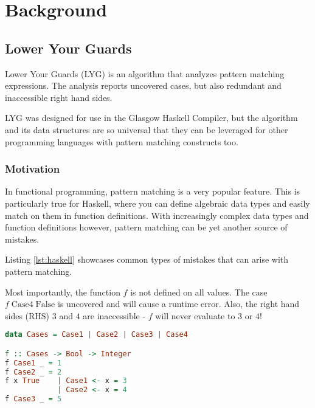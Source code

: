 \chapter{Background}\label{sec:background}

\section{Lower Your Guards}

Lower Your Guards (LYG) is an algorithm that analyzes pattern matching expressions.
The analysis reports uncovered cases, but also redundant and inaccessible right hand sides.

LYG was designed for use in the Glasgow Haskell Compiler,
but the algorithm and its data structures are so universal
that they can be leveraged for other programming languages with pattern matching constructs too.


\subsection{Motivation}

In functional programming, pattern matching is a very popular feature.
This is particularly true for Haskell, where you can define algebraic data types
and easily match on them in function definitions.
With increasingly complex data types and function definitions however,
pattern matching can be yet another source of mistakes.

Listing \ref{lst:haskell} showcases common types of mistakes that can arise with pattern matching.

Most importantly, the function $f$ is not defined on all values.
The case $f\;\mathrm{Case4}\;\mathrm{False}$ is uncovered and will cause a runtime error.
Also, the right hand sides (RHS) $3$ and $4$ are inaccessible - $f$ will never evaluate to $3$ or $4$!

\begin{lstlisting}[caption={A Pattern Matching Example In Haskell},label={lst:haskell},language=Haskell]
data Cases = Case1 | Case2 | Case3 | Case4

f :: Cases -> Bool -> Integer
f Case1 _ = 1
f Case2 _ = 2
f x True    | Case1 <- x = 3
            | Case2 <- x = 4
f Case3 _ = 5
\end{lstlisting}

